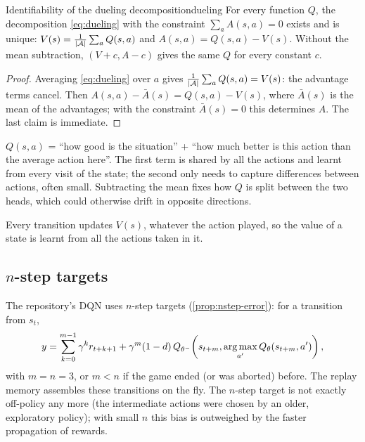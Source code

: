 \begin{proposition}{Identifiability of the dueling decomposition}{dueling}
  For every function $Q$, the decomposition \eqref{eq:dueling} with the
  constraint $\sum_a A(s, a) = 0$ exists and is unique: $V(s) =
  \frac{1}{\left\lvert \mathcal{A} \right\rvert} \sum_a Q(s, a)$ and $A(s, a) = Q(s, a) - V(s)$.
  Without the mean subtraction, $(V + c, A - c)$ gives the same $Q$ for
  every constant $c$.
\end{proposition}

\begin{proof}
  Averaging \eqref{eq:dueling} over $a$ gives $\frac{1}{\left\lvert \mathcal{A} \right\rvert}
  \sum_a Q(s, a) = V(s)$: the advantage terms cancel. Then $A(s, a) - \bar
  A(s) = Q(s, a) - V(s)$, where $\bar A(s)$ is the mean of the advantages;
  with the constraint $\bar A(s) = 0$ this determines $A$. The last claim
  is immediate.
\end{proof}

\begin{intuition}
  $Q(s, a)$ = ``how good is the situation'' + ``how much better is this
  action than the average action here''. The first term is shared by all
  the actions and learnt from every visit of the state; the second only
  needs to capture differences between actions, often small. Subtracting
  the mean fixes how $Q$ is split between the two heads, which could
  otherwise drift in opposite directions.
\end{intuition}

Every transition updates $V(s)$, whatever the action played, so the value
of a state is learnt from all the actions taken in it.

\subsection{$n$-step targets}

The repository's DQN uses $n$-step targets (\cref{prop:nstep-error}): for a
transition from $s_t$,
\begin{equation}
  y = \sum_{k=0}^{m-1} \gamma^k r_{t+k+1} + \gamma^m (1 - d)\,
  Q_{\theta^-}\!\left(s_{t+m}, \operatorname*{arg\,max}_{a'} Q_\theta(s_{t+m}, a')\right),
\end{equation}
with $m = n = 3$, or $m < n$ if the game ended (or was aborted) before. The
replay memory assembles these transitions on the fly. The $n$-step target
is not exactly off-policy any more (the intermediate actions were chosen by
an older, exploratory policy); with small $n$ this bias is outweighed by
the faster propagation of rewards.

